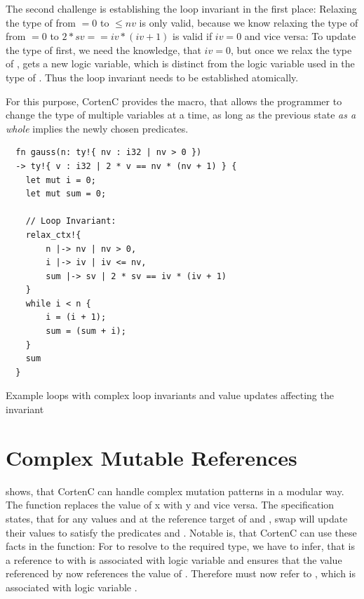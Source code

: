\documentclass[twoside, english]{sdqthesis}
\theoremstyle{definition}
\begin{document}
The second challenge is establishing the loop invariant in the first place: Relaxing the type of  from $= 0$ to $\leq nv$ is only valid, because we know relaxing the type of  from $= 0$ to $ 2 * sv == iv * (iv + 1)$ is valid if $iv = 0$ and vice versa: To update the type of  first, we need the knowledge, that $iv = 0$, but once we relax the type of ,  gets a new logic variable, which is distinct from the logic variable used in the type of . Thus the loop invariant needs to be established atomically.

For this purpose, CortenC provides the  macro, that allows the programmer to change the type of multiple variables at a time, as long as the previous state \textit{as a whole} implies the newly chosen predicates.

\begin{listing}[ht]
  \begin{verbatim}
  fn gauss(n: ty!{ nv : i32 | nv > 0 }) 
  -> ty!{ v : i32 | 2 * v == nv * (nv + 1) } {
    let mut i = 0;
    let mut sum = 0;
    
    // Loop Invariant:
    relax_ctx!{
        n |-> nv | nv > 0,
        i |-> iv | iv <= nv,
        sum |-> sv | 2 * sv == iv * (iv + 1)
    }
    while i < n {
        i = (i + 1);
        sum = (sum + i);
    }
    sum
  }
  \end{verbatim}
  \caption{Example loops with complex loop invariants and value updates affecting the invariant}
  \label{lst:gauss}
\end{listing}

\label{subsec:evaluation-complex-mutable-ref}\section{Complex Mutable References}

 shows, that CortenC can handle complex mutation patterns in a modular way. 
The  function replaces the value of x with y and vice versa. The specification states, that for any values  and  at the reference target of  and , swap will update their values to satisfy the predicates  and .
Notable is, that CortenC can use these facts in the  function: For  to resolve to the required type, we have to infer, that  is a reference to  with is associated with logic variable  and  ensures that the value referenced by  now references the value of . Therefore  must now refer to , which is associated with logic variable .
\end{document}
